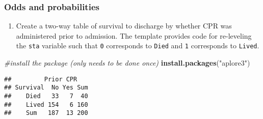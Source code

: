 \documentclass[
]{article}
\newenvironment{Shaded}{\begin{snugshade}}{\end{snugshade}}
\newcommand{\AttributeTok}[1]{\textcolor[rgb]{0.13,0.29,0.53}{#1}}
\newcommand{\CommentTok}[1]{\textcolor[rgb]{0.56,0.35,0.01}{\textit{#1}}}
\newcommand{\FunctionTok}[1]{\textcolor[rgb]{0.13,0.29,0.53}{\textbf{#1}}}
\newcommand{\NormalTok}[1]{#1}
\newcommand{\OtherTok}[1]{\textcolor[rgb]{0.56,0.35,0.01}{#1}}
\newcommand{\SpecialCharTok}[1]{\textcolor[rgb]{0.81,0.36,0.00}{\textbf{#1}}}
\newcommand{\StringTok}[1]{\textcolor[rgb]{0.31,0.60,0.02}{#1}}
\providecommand{\tightlist}{%
  \setlength{\itemsep}{0pt}\setlength{\parskip}{0pt}}
\begin{document}
\subsubsection{Odds and probabilities}\label{odds-and-probabilities}

\begin{enumerate}
\def\labelenumi{\arabic{enumi}.}
\tightlist
\item
  Create a two-way table of survival to discharge by whether CPR was
  administered prior to admission. The template provides code for
  re-leveling the \texttt{sta} variable such that \texttt{0} corresponds
  to \texttt{Died} and \texttt{1} corresponds to \texttt{Lived}.
\end{enumerate}

\begin{Shaded}
\begin{Highlighting}[]
\CommentTok{\#install the package (only needs to be done once)}
\FunctionTok{install.packages}\NormalTok{(}\StringTok{"aplore3"}\NormalTok{)}
\end{Highlighting}
\end{Shaded}

\begin{Shaded}
\end{Shaded}

\begin{verbatim}
##         Prior CPR
## Survival  No Yes Sum
##    Died   33   7  40
##    Lived 154   6 160
##    Sum   187  13 200
\end{verbatim}
\end{document}
